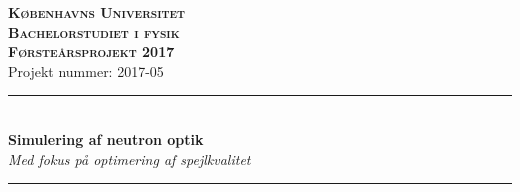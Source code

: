 \documentclass[12pt,oneside,a4paper]{article}
\begin{document}


\begin{center}
    {\textsc {\LARGE \bf{Københavns Universitet \\[0.3cm]  Bachelorstudiet i fysik}}}\\[1.5cm]
    {\textsc {\Large \bf Førsteårsprojekt 2017}}\\[0.8cm]
    {\Large Projekt nummer: 2017-05}\\[1cm]
    
    \rule{15cm}{0.01cm}\\[1cm]
    {\LARGE\bf  Simulering af neutron optik} \\ {\it Med fokus på optimering af spejlkvalitet}\\ [0.5cm]
    \rule{15cm}{0.01cm}\\[1cm]
\end{center}
\end{document}
